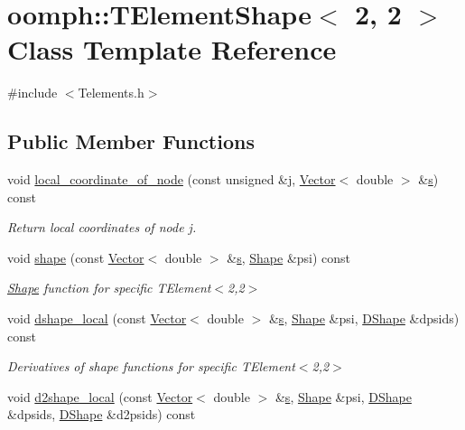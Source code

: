 \hypertarget{classoomph_1_1TElementShape_3_012_00_012_01_4}{}\section{oomph\+:\+:T\+Element\+Shape$<$ 2, 2 $>$ Class Template Reference}
\label{classoomph_1_1TElementShape_3_012_00_012_01_4}


{\ttfamily \#include $<$Telements.\+h$>$}

\subsection*{Public Member Functions}
\begin{DoxyCompactItemize}
\item 
void \hyperlink{classoomph_1_1TElementShape_3_012_00_012_01_4_a7271df560302bad7f91c997e13495fab}{local\+\_\+coordinate\+\_\+of\+\_\+node} (const unsigned \&j, \hyperlink{classoomph_1_1Vector}{Vector}$<$ double $>$ \&\hyperlink{cfortran_8h_ab7123126e4885ef647dd9c6e3807a21c}{s}) const
\begin{DoxyCompactList}\small\item\em Return local coordinates of node j. \end{DoxyCompactList}\item 
void \hyperlink{classoomph_1_1TElementShape_3_012_00_012_01_4_a6c10a285d1008251cd8a6cb6cd58411d}{shape} (const \hyperlink{classoomph_1_1Vector}{Vector}$<$ double $>$ \&\hyperlink{cfortran_8h_ab7123126e4885ef647dd9c6e3807a21c}{s}, \hyperlink{classoomph_1_1Shape}{Shape} \&psi) const
\begin{DoxyCompactList}\small\item\em \hyperlink{classoomph_1_1Shape}{Shape} function for specific T\+Element$<$2,2$>$ \end{DoxyCompactList}\item 
void \hyperlink{classoomph_1_1TElementShape_3_012_00_012_01_4_aaeb1b437fff56c08eaa5d949ebbc557e}{dshape\+\_\+local} (const \hyperlink{classoomph_1_1Vector}{Vector}$<$ double $>$ \&\hyperlink{cfortran_8h_ab7123126e4885ef647dd9c6e3807a21c}{s}, \hyperlink{classoomph_1_1Shape}{Shape} \&psi, \hyperlink{classoomph_1_1DShape}{D\+Shape} \&dpsids) const
\begin{DoxyCompactList}\small\item\em Derivatives of shape functions for specific T\+Element$<$2,2$>$ \end{DoxyCompactList}\item 
void \hyperlink{classoomph_1_1TElementShape_3_012_00_012_01_4_aab482c9a8774c643051608ad2da3bc32}{d2shape\+\_\+local} (const \hyperlink{classoomph_1_1Vector}{Vector}$<$ double $>$ \&\hyperlink{cfortran_8h_ab7123126e4885ef647dd9c6e3807a21c}{s}, \hyperlink{classoomph_1_1Shape}{Shape} \&psi, \hyperlink{classoomph_1_1DShape}{D\+Shape} \&dpsids, \hyperlink{classoomph_1_1DShape}{D\+Shape} \&d2psids) const
\end{DoxyCompactItemize}


